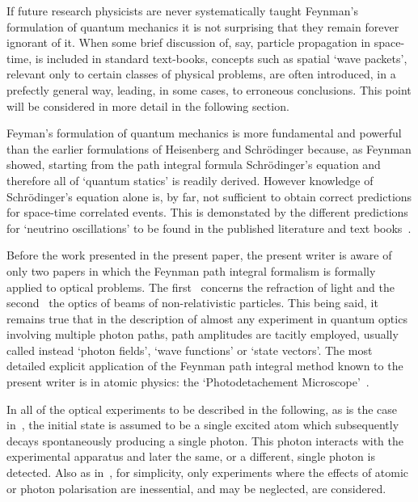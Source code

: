    If future research physicists are never systematically taught Feynman's formulation
  of quantum mechanics it is not surprising that they remain forever ignorant of it. 
    When some brief discussion of, say, particle
  propagation in space-time, is included in standard text-books, concepts such as
  spatial `wave packets', relevant only to certain classes of physical problems, 
  are often introduced, in a prefectly general way, leading, in some cases, to erroneous conclusions.
  This point will be 
   considered in more detail in the following section. 
  \par Feyman's formulation of quantum mechanics is more fundamental and powerful
   than the earlier formulations of Heisenberg and Schr\"{o}dinger because, as Feynman
   showed, starting from the path integral formula Schr\"{o}dinger's
   equation and therefore all of `quantum statics' is readily derived. However 
    knowledge of  Schr\"{o}dinger's equation alone is, by far, not sufficient to obtain
   correct predictions for space-time correlated events. This is demonstated by the
   different predictions for `neutrino oscillations' to be found in the published 
   literature and text books~\cite{JHF1,JHF2,JHF3}.
   \par Before the work presented in the present paper, the present writer is aware 
   of only two papers in which the Feynman path integral formalism is formally 
   applied to optical problems. The first~\cite{BGdeG} concerns the refraction
   of light and the second~\cite{BB} the optics of beams of non-relativistic particles.
   This being said, it remains true that in the description of almost any experiment in
   quantum optics involving multiple photon paths, path amplitudes are tacitly employed,
   usually called instead `photon fields', `wave functions' or `state vectors'. The most detailed
   explicit application of the Feynman path integral method known to the present 
   writer is in atomic physics: the `Photodetachement Microscope'~\cite{BBD}.
    \par In all of the optical experiments to be described in the following, as is the 
    case in~\cite{Feyn1}, the initial state is assumed to be a single
    excited atom which subsequently decays spontaneously producing a single photon.
    This photon interacts with the experimental apparatus and later the same, 
    or a different, single photon is detected. Also as in~\cite{Feyn1}, for simplicity,
    only experiments where the effects of atomic or photon polarisation are inessential, and 
    may be neglected, are considered.
